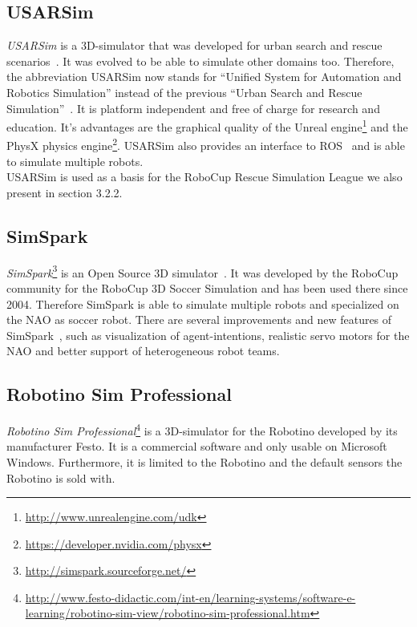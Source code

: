 \subsection{USARSim}
\textit{USARSim} is a 3D-simulator that was developed for urban search and rescue scenarios~\cite{USARSim}. It was evolved to be able to simulate other domains too. Therefore, the abbreviation USARSim now stands for ``Unified System for Automation 
and Robotics Simulation'' instead of the previous ``Urban Search and Rescue Simulation''~\cite{usarsim_new}. It is platform independent and free of charge for research and education. It's advantages are the graphical quality of the Unreal engine\footnote{\url{http://www.unrealengine.com/udk}} and the PhysX physics engine\footnote{\url{https://developer.nvidia.com/physx}}. USARSim also provides an interface to ROS~\cite{USARSimROS} and is able to simulate multiple robots.\\
USARSim is used as a basis for the RoboCup Rescue Simulation League we also present in section 3.2.2.

\subsection{SimSpark}
\textit{SimSpark}\footnote{\url{http://simspark.sourceforge.net/}} is an Open Source 3D simulator~\cite{simspark_old}. It was developed by the RoboCup community for the RoboCup 3D Soccer Simulation and has been used there since 2004. Therefore SimSpark is able to simulate multiple robots and specialized on the NAO as soccer robot. There are several improvements and new features of SimSpark~\cite{SimSpark,Visualization}, such as visualization of agent-intentions, realistic servo motors for the NAO and better support of heterogeneous robot teams.

\subsection{Robotino Sim Professional}
\textit{Robotino Sim Professional}\footnote{\url{http://www.festo-didactic.com/int-en/learning-systems/software-e-learning/robotino-sim-view/robotino-sim-professional.htm}} is a 3D-simulator for the Robotino developed by its manufacturer Festo. It is a commercial software and only usable on Microsoft Windows. Furthermore, it is limited to the Robotino and the default sensors the Robotino is sold with.

